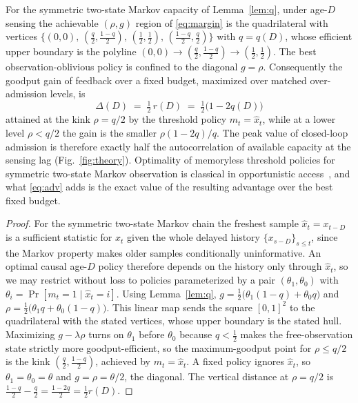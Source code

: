 \begin{theorem}\label{thm:limit}
For the symmetric two-state Markov capacity of Lemma~\ref{lem:q}, under age-$D$
sensing the achievable $(\rho,g)$ region of \eqref{eq:margin} is the
quadrilateral with vertices
$\{(0,0),\,(\tfrac{q}{2},\tfrac{1-q}{2}),\,(\tfrac12,\tfrac12),\,
(\tfrac{1-q}{2},\tfrac{q}{2})\}$ with $q=q(D)$, whose efficient upper boundary is
the polyline $(0,0)\!\to\!(\tfrac q2,\tfrac{1-q}2)\!\to\!(\tfrac12,\tfrac12)$.
The best observation-oblivious policy is confined to the diagonal $g=\rho$.
Consequently the goodput gain of feedback over a fixed budget, maximized over
matched over-admission levels, is
\begin{equation}\label{eq:adv}
\boxed{\;\Delta(D)\;=\;\tfrac12\,r(D)\;=\;\tfrac12\big(1-2q(D)\big)\;}
\end{equation}
attained at the kink $\rho=q/2$ by the threshold policy $m_t=\hat x_t$, while at a
lower level $\rho<q/2$ the gain is the smaller $\rho(1-2q)/q$. The peak value of
closed-loop admission is therefore exactly half the autocorrelation of available
capacity at the sensing lag (Fig.~\ref{fig:theory}). Optimality of memoryless
threshold policies for symmetric two-state Markov observation is classical in
opportunistic access~\cite{myopicaccess}, and what \eqref{eq:adv} adds is the
exact value of the resulting advantage over the best fixed budget.
\end{theorem}
\begin{proof}
For the symmetric two-state Markov chain the freshest sample $\hat x_t=x_{t-D}$ is
a sufficient statistic for $x_t$ given the whole delayed history
$\{x_{s-D}\}_{s\le t}$, since the Markov property makes older samples
conditionally uninformative. An optimal causal age-$D$ policy therefore depends on
the history only through $\hat x_t$, so we may restrict without loss to policies
parameterized by a pair $(\theta_1,\theta_0)$ with
$\theta_i=\Pr[m_t{=}1\mid\hat x_t{=}i]$. Using Lemma~\ref{lem:q},
$g=\tfrac12\big(\theta_1(1{-}q)+\theta_0 q\big)$ and
$\rho=\tfrac12\big(\theta_1 q+\theta_0(1{-}q)\big)$. This linear map sends the
square $[0,1]^2$ to the quadrilateral with the stated vertices, whose upper
boundary is the stated hull. Maximizing $g-\lambda\rho$ turns on $\theta_1$ before
$\theta_0$ because $q<\tfrac12$ makes the free-observation state strictly more
goodput-efficient, so the maximum-goodput point for $\rho\le q/2$ is the kink
$(\tfrac q2,\tfrac{1-q}2)$, achieved by $m_t=\hat x_t$. A fixed policy ignores
$\hat x_t$, so $\theta_1=\theta_0=\theta$ and $g=\rho=\theta/2$, the diagonal. The
vertical distance at $\rho=q/2$ is
$\tfrac{1-q}{2}-\tfrac q2=\tfrac{1-2q}{2}=\tfrac12 r(D)$.
\end{proof}


